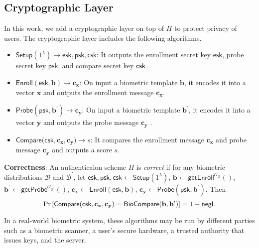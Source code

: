 

\subsection{Cryptographic Layer}

In this work, we add a cryptographic layer on top of $\Pi$ to protect privacy of users. The cryptographic layer includes the following algorithms.

\begin{itemize}

	\item $\textsf{Setup}(1^\lambda) \to \textsf{esk}, \textsf{psk}, \textsf{csk}$: It outputs the enrollment secret key $\textsf{esk}$, probe secret key $\textsf{psk}$, and compare secret key $\sf csk$.

	\item $\textsf{Enroll}(\textsf{esk}, \mathbf{b}) \to \mathbf{c_x}$: On input a biometric template $\mathbf{b}$, it encodes it into a vector $\mathbf{x}$ and outputs the enrollment message $\mathbf{c_x}$.
	
	\item $\textsf{Probe}(\textsf{psk}, \mathbf{b}^\prime) \to \mathbf{c_y}$: On input a biometric template $\mathbf{b}^\prime$, it encodes it into a vector $\mathbf{y}$ and outputs the probe message $\mathbf{c_y}$ .

	\item $\textsf{Compare}(\textsf{csk}, \mathbf{c_x}, \mathbf{c_y)} \to s$: It compares the enrollment message $\mathbf{c_x}$ and probe message $\mathbf{c_y}$ and outputs a score $s$.

\end{itemize}

\noindent \textbf{Correctness}: An authenticaion scheme $\Pi$ is \emph{correct} if for any biometric distributions $\mathcal{B}$ and $\mathcal{B}^\prime$, let $\textsf{esk}, \textsf{psk}, \textsf{csk} \gets \textsf{Setup}(1^\lambda)$, $\mathbf{b} \gets \textsf{getEnroll}^{\mathcal{O}_\mathcal{B}}()$, $\mathbf{b}^\prime \gets \textsf{getProbe}^{\mathcal{O}_{\mathcal{B}^\prime}}()$, $\mathbf{c_x} \gets \textsf{Enroll}(\textsf{esk}, \mathbf{b})$, $\mathbf{c_y} \gets \textsf{Probe}(\textsf{psk}, \mathbf{b}^\prime)$. Then
	\[
		\Pr \left [
			\textsf{Compare}(\textsf{csk}, \mathbf{c_x}, \mathbf{c_y}) = \textsf{BioCompare}(\mathbf{b}, \mathbf{b}^\prime)
		\right ] = 1 - \mathsf{negl}.
	\]

In a real-world biometric system, these algorithms may be run by different parties such as a biometric scanner, a user's secure hardware, a trusted authority that issues keys, and the server.


